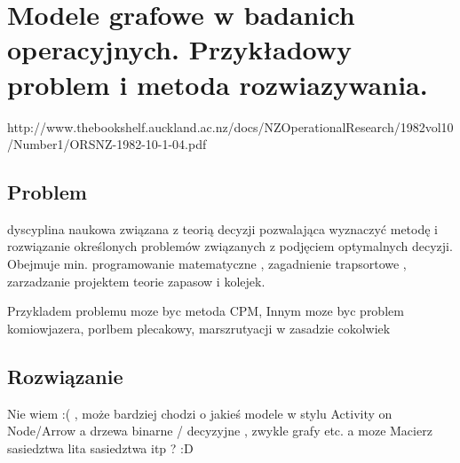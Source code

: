 \section{Modele grafowe w badanich operacyjnych. Przykładowy problem i metoda rozwiazywania.}
http://www.thebookshelf.auckland.ac.nz/docs/NZOperationalResearch/1982vol10/Number1/ORSNZ-1982-10-1-04.pdf
\subsection{Problem}
dyscyplina naukowa związana z teorią decyzji pozwalająca wyznaczyć metodę i rozwiązanie określonych problemów związanych z podjęciem optymalnych decyzji. Obejmuje min. programowanie matematyczne , zagadnienie trapsortowe , zarzadzanie projektem teorie zapasow i kolejek.

Przykladem problemu moze byc metoda CPM, Innym moze byc problem komiowjazera, porlbem plecakowy, marszrutyacji w zasadzie cokolwiek
\subsection{Rozwiązanie}
Nie wiem :( , może bardziej chodzi o jakieś modele w stylu Activity on Node/Arrow a drzewa binarne / decyzyjne , zwykle grafy etc. a moze Macierz sasiedztwa lita sasiedztwa itp ? :D 

